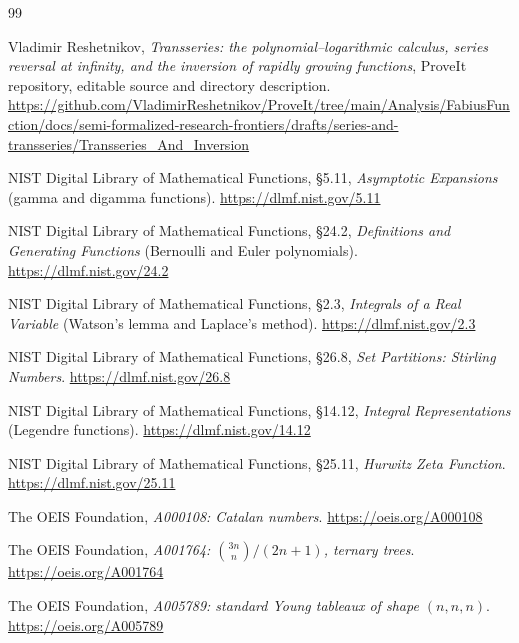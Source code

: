 \documentclass[11pt,a4paper]{article}
\numberwithin{equation}{section}
\theoremstyle{definition}
\theoremstyle{remark}
\begin{document}
\begin{thebibliography}{99}
\small

Vladimir Reshetnikov, \emph{Transseries: the polynomial--logarithmic calculus, series reversal at infinity, and the inversion of rapidly growing functions}, ProveIt repository, editable source and directory description.\newline
\url{https://github.com/VladimirReshetnikov/ProveIt/tree/main/Analysis/FabiusFunction/docs/semi-formalized-research-frontiers/drafts/series-and-transseries/Transseries_And_Inversion}

NIST Digital Library of Mathematical Functions, \S5.11, \emph{Asymptotic Expansions} (gamma and digamma functions).\newline
\url{https://dlmf.nist.gov/5.11}

NIST Digital Library of Mathematical Functions, \S24.2, \emph{Definitions and Generating Functions} (Bernoulli and Euler polynomials).\newline
\url{https://dlmf.nist.gov/24.2}

NIST Digital Library of Mathematical Functions, \S2.3, \emph{Integrals of a Real Variable} (Watson's lemma and Laplace's method).\newline
\url{https://dlmf.nist.gov/2.3}

NIST Digital Library of Mathematical Functions, \S26.8, \emph{Set Partitions: Stirling Numbers}.\newline
\url{https://dlmf.nist.gov/26.8}

NIST Digital Library of Mathematical Functions, \S14.12, \emph{Integral Representations} (Legendre functions).\newline
\url{https://dlmf.nist.gov/14.12}

NIST Digital Library of Mathematical Functions, \S25.11, \emph{Hurwitz Zeta Function}.\newline
\url{https://dlmf.nist.gov/25.11}

The OEIS Foundation, \emph{A000108: Catalan numbers}.\newline
\url{https://oeis.org/A000108}

The OEIS Foundation, \emph{A001764: $\binom{3n}{n}/(2n+1)$, ternary trees}.\newline
\url{https://oeis.org/A001764}

The OEIS Foundation, \emph{A005789: standard Young tableaux of shape $(n,n,n)$}.\newline
\url{https://oeis.org/A005789}


\end{thebibliography}
\end{document}
